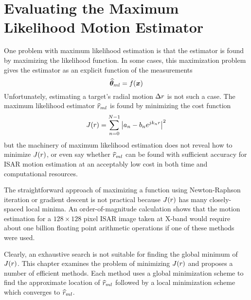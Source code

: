 %
%
%
%
%
%
%

\chapter[Evaluating the ML Motion Estimator]{Evaluating the Maximum Likelihood Motion Estimator}
\label{ee chp}

\bigletter One problem with maximum likelihood estimation is that the
estimator is found by maximizing the likelihood function.  In some cases,
this maximization problem gives the estimator as an explicit function of the
measurements
\begin{equation}
\widehat{\bm{\theta}}_{ml}=f(\bm{x})
\end{equation}
Unfortunately, estimating a target's radial motion ${\Delta r}$ is not such a
case.  The maximum likelihood estimator $\widehat{r}_{ml}$ is found by minimizing the 
cost function
\begin{equation}\label{ee eqn:J(r)}
J({r})=\sum_{n=0}^{N-1} \left|a_n-b_n{e^{jk_n{r}}}\right|^2
\end{equation}
but the machinery of maximum likelihood estimation does not reveal how to
minimize $J({r})$, or even say whether $\widehat{r}_{ml}$ can be found with
sufficient accuracy for ISAR motion estimation at an acceptably low cost in
both time and computational resources.

The straightforward approach of maximizing a function using Newton-Raphson
iteration or gradient descent is not practical because $J({r})$ has many
closely-spaced local minima.  An order-of-magnitude calculation shows that 
the motion estimation for a $128\times 128$ pixel ISAR image taken at
X-band would require about one billion floating point arithmetic operations
if one of these methods were used.

Clearly, an exhaustive search is not suitable for finding the global minimum
of $J({r})$.  This chapter examines the problem of minimizing $J({r})$ and
proposes a number of efficient methods.   Each method uses a global 
minimization scheme to find the approximate location of $\widehat{r}_{ml}$ followed by a
local minimization scheme which converges to $\widehat{r}_{ml}$.

